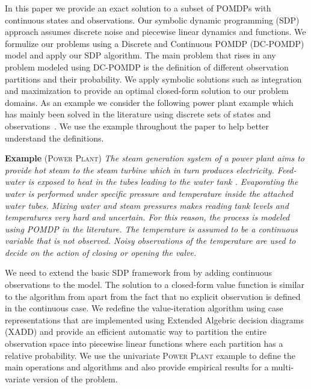 \documentclass{article} %
\begin{document}
In this paper we provide an exact solution to a subset of POMDPs with continuous states and observations. Our symbolic dynamic programming (SDP) approach assumes discrete noise and piecewise linear dynamics and functions. We formulize our problems using a Discrete and Continuous POMDP (DC-POMDP) model and apply our SDP algorithm. The main problem that rises in any problem modeled using DC-POMDP is the definition of different observation partitions and their probability. We apply symbolic solutions such as integration and maximization to provide an optimal closed-form solution to our problem domains. 
As an example we consider the following power plant example which has mainly been solved in the literature using discrete sets of states and observations~\cite{steam2}. We use the example throughout the paper to help better understand the definitions. 

\textbf{Example} \textsc{(Power Plant)}
\emph{The steam generation system of a power plant aims to provide hot steam to the steam turbine which in turn produces electricity. Feed-water is exposed to heat in the tubes leading to the water tank . Evaporating the water is performed under specific pressure and temperature inside the attached water tubes. 
Mixing water and steam pressures makes reading tank levels and temperatures very hard and uncertain. For this reason, the process is modeled using POMDP in the literature. The temperature is assumed to be a continuous variable that is not observed. Noisy observations of the temperature are used to decide on the action of closing or opening the valve.}

We need to extend the basic SDP framework from \cite{sanner_uai11} by adding continuous observations to the model. The solution to a closed-form value function is similar to the algorithm from \cite{monahan82} apart from the fact that no explicit observation is defined in the continuous case. We redefine the value-iteration algorithm using case representations that are implemented using Extended Algebric decision diagrams (XADD) and provide an efficient automatic way to partition the entire observation space into piecewise linear functions where each partition has a relative probability. We use the univariate \textsc{Power Plant} example to define the main operations and algorithms and also provide empirical results for a multi-variate version of the problem. 
\end{document}
